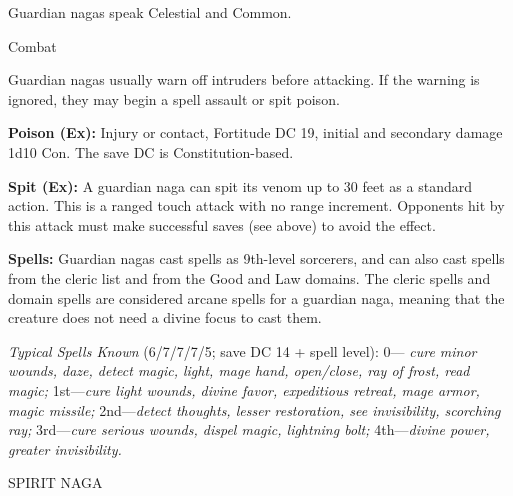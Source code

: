 \documentclass{article}
\begin{document}
Guardian nagas speak Celestial and Common.

Combat

Guardian nagas usually warn off intruders before attacking. If the warning is ignored, 
they may begin a spell assault or spit poison.

\textbf{Poison (Ex): }Injury or contact, Fortitude DC 19, initial and secondary 
damage 1d10 Con. The save DC is Constitution-based.

\textbf{Spit (Ex):} A guardian naga can spit its venom up to 30 feet as a standard 
action. This is a ranged touch attack with no range increment. Opponents hit by 
this attack must make successful saves (see above) to avoid the effect.

\textbf{Spells: }Guardian nagas cast spells as 9th-level sorcerers, and can also 
cast spells from the cleric list and from the Good and Law domains. The cleric 
spells and domain spells are considered arcane spells for a guardian naga, meaning 
that the creature does not need a divine focus to cast them.

\textit{Typical Spells Known }(6/7/7/7/5; save DC 14 + spell level): 0--- \textit{cure 
minor wounds, daze, detect magic, light, mage hand, open/close, ray of frost, read 
magic; }1st---\textit{cure light wounds, divine favor, expeditious retreat, mage 
armor, magic missile; }2nd---\textit{detect thoughts, lesser restoration, see invisibility, 
scorching ray; }3rd---\textit{cure serious wounds, dispel magic, lightning bolt; 
}4th---\textit{divine power, greater invisibility.}

\vspace{12pt}
SPIRIT NAGA
\end{document}
